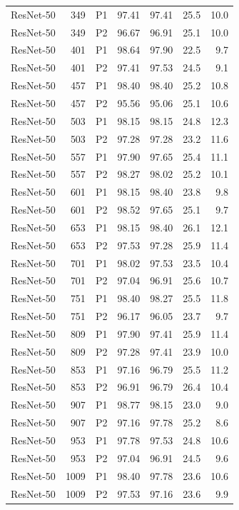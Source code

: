 {\begin{longtable}{lrlrrrr}
ResNet-50 & 349 & P1 & 97.41 & 97.41 & 25.5 & 10.0 \\
ResNet-50 & 349 & P2 & 96.67 & 96.91 & 25.1 & 10.0 \\
ResNet-50 & 401 & P1 & 98.64 & 97.90 & 22.5 & 9.7 \\
ResNet-50 & 401 & P2 & 97.41 & 97.53 & 24.5 & 9.1 \\
ResNet-50 & 457 & P1 & 98.40 & 98.40 & 25.2 & 10.8 \\
ResNet-50 & 457 & P2 & 95.56 & 95.06 & 25.1 & 10.6 \\
ResNet-50 & 503 & P1 & 98.15 & 98.15 & 24.8 & 12.3 \\
ResNet-50 & 503 & P2 & 97.28 & 97.28 & 23.2 & 11.6 \\
ResNet-50 & 557 & P1 & 97.90 & 97.65 & 25.4 & 11.1 \\
ResNet-50 & 557 & P2 & 98.27 & 98.02 & 25.2 & 10.1 \\
ResNet-50 & 601 & P1 & 98.15 & 98.40 & 23.8 & 9.8 \\
ResNet-50 & 601 & P2 & 98.52 & 97.65 & 25.1 & 9.7 \\
ResNet-50 & 653 & P1 & 98.15 & 98.40 & 26.1 & 12.1 \\
ResNet-50 & 653 & P2 & 97.53 & 97.28 & 25.9 & 11.4 \\
ResNet-50 & 701 & P1 & 98.02 & 97.53 & 23.5 & 10.4 \\
ResNet-50 & 701 & P2 & 97.04 & 96.91 & 25.6 & 10.7 \\
ResNet-50 & 751 & P1 & 98.40 & 98.27 & 25.5 & 11.8 \\
ResNet-50 & 751 & P2 & 96.17 & 96.05 & 23.7 & 9.7 \\
ResNet-50 & 809 & P1 & 97.90 & 97.41 & 25.9 & 11.4 \\
ResNet-50 & 809 & P2 & 97.28 & 97.41 & 23.9 & 10.0 \\
ResNet-50 & 853 & P1 & 97.16 & 96.79 & 25.5 & 11.2 \\
ResNet-50 & 853 & P2 & 96.91 & 96.79 & 26.4 & 10.4 \\
ResNet-50 & 907 & P1 & 98.77 & 98.15 & 23.0 & 9.0 \\
ResNet-50 & 907 & P2 & 97.16 & 97.78 & 25.2 & 8.6 \\
ResNet-50 & 953 & P1 & 97.78 & 97.53 & 24.8 & 10.6 \\
ResNet-50 & 953 & P2 & 97.04 & 96.91 & 24.5 & 9.6 \\
ResNet-50 & 1009 & P1 & 98.40 & 97.78 & 23.6 & 10.6 \\
ResNet-50 & 1009 & P2 & 97.53 & 97.16 & 23.6 & 9.9 \\

\end{longtable}}
